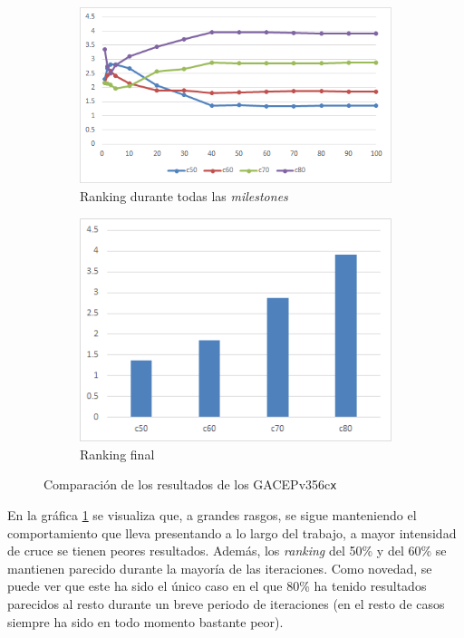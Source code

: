 \begin{figure}[h]
     \centering
     \begin{subfigure}[b]{0.45\textwidth}
         \centering
         \includegraphics[width=\textwidth]{imagenes/Experimental/GACEPv356.png}
         \caption{Ranking durante todas las \textit{milestones}}
         \label{fig:GACEPv356_lineas}
     \end{subfigure}
     \hfill
     \begin{subfigure}[b]{0.45\textwidth}
         \centering
         \includegraphics[width=\textwidth]{imagenes/Experimental/barras/GACEPv356.png}
         \caption{Ranking final}
         \label{fig:GACEPv356_barras}
     \end{subfigure}
        \caption{Comparación de los resultados de los GACEPv356c\texttt{x}}
        \label{fig:GACEPv356}
\end{figure}

En la gráfica \ref{fig:GACEPv356_lineas} se visualiza que, a grandes rasgos, se sigue manteniendo el comportamiento que lleva presentando a lo largo del trabajo, a mayor intensidad de cruce se tienen peores resultados. 
Además, los \textit{ranking} del 50\% y del 60\% se mantienen parecido durante la mayoría de las iteraciones. 
Como novedad, se puede ver que este ha sido el único caso en el que 80\% ha tenido resultados parecidos al resto durante un breve periodo de iteraciones (en el resto de casos siempre ha sido en todo momento bastante peor).

